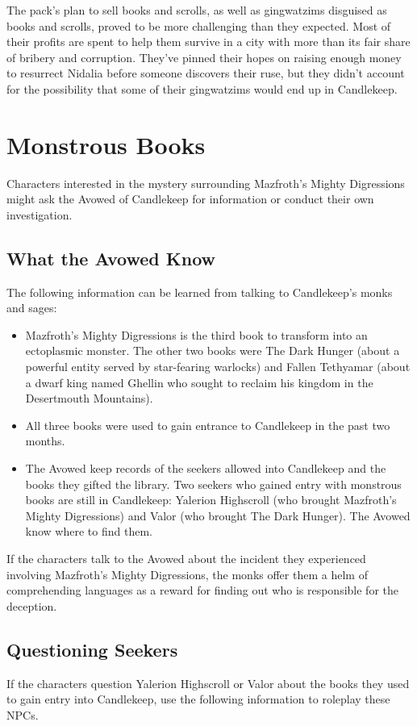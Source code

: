 \documentclass[10pt,a4paper,twoside,bg=print,twocolumn,openany,nodeprecatedcode]{dndbook}
\begin{document}
The pack's plan to sell books and scrolls, as well as gingwatzims disguised as books and scrolls, proved to be more challenging than they expected. Most of their profits are spent to help them survive in a city with more than its fair share of bribery and corruption. They've pinned their hopes on raising enough money to resurrect Nidalia before someone discovers their ruse, but they didn't account for the possibility that some of their gingwatzims would end up in Candlekeep.

\section{Monstrous Books}
Characters interested in the mystery surrounding Mazfroth's Mighty Digressions might ask the Avowed of Candlekeep for information or conduct their own investigation.

\subsection{What the Avowed Know}
The following information can be learned from talking to Candlekeep's monks and sages:


\begin{itemize}
\item Mazfroth's Mighty Digressions is the third book to transform into an ectoplasmic monster. The other two books were The Dark Hunger (about a powerful entity served by star-fearing warlocks) and Fallen Tethyamar (about a dwarf king named Ghellin who sought to reclaim his kingdom in the Desertmouth Mountains).
\item All three books were used to gain entrance to Candlekeep in the past two months.
\item The Avowed keep records of the seekers allowed into Candlekeep and the books they gifted the library. Two seekers who gained entry with monstrous books are still in Candlekeep: Yalerion Highscroll (who brought Mazfroth's Mighty Digressions) and Valor (who brought The Dark Hunger). The Avowed know where to find them.
\end{itemize}

If the characters talk to the Avowed about the incident they experienced involving Mazfroth's Mighty Digressions, the monks offer them a helm of comprehending languages as a reward for finding out who is responsible for the deception.

\subsection{Questioning Seekers}
If the characters question Yalerion Highscroll or Valor about the books they used to gain entry into Candlekeep, use the following information to roleplay these NPCs.
\end{document}

